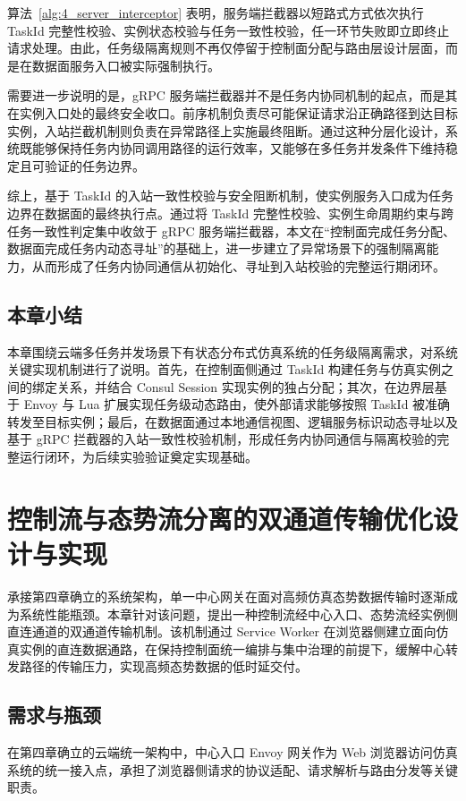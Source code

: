 \documentclass[lang=chs, degree=master, blindreview=true, winfonts=true, academic=false]{yanputhesis}
\begin{document}
算法~\ref{alg:4_server_interceptor} 表明，服务端拦截器以短路式方式依次执行 TaskId 完整性校验、实例状态校验与任务一致性校验，任一环节失败即立即终止请求处理。由此，任务级隔离规则不再仅停留于控制面分配与路由层设计层面，而是在数据面服务入口被实际强制执行。

需要进一步说明的是，gRPC 服务端拦截器并不是任务内协同机制的起点，而是其在实例入口处的最终安全收口。前序机制负责尽可能保证请求沿正确路径到达目标实例，入站拦截机制则负责在异常路径上实施最终阻断。通过这种分层化设计，系统既能够保持任务内协同调用路径的运行效率，又能够在多任务并发条件下维持稳定且可验证的任务边界。

综上，基于 TaskId 的入站一致性校验与安全阻断机制，使实例服务入口成为任务边界在数据面的最终执行点。通过将 TaskId 完整性校验、实例生命周期约束与跨任务一致性判定集中收敛于 gRPC 服务端拦截器，本文在“控制面完成任务分配、数据面完成任务内动态寻址”的基础上，进一步建立了异常场景下的强制隔离能力，从而形成了任务内协同通信从初始化、寻址到入站校验的完整运行期闭环。

\section{本章小结}

本章围绕云端多任务并发场景下有状态分布式仿真系统的任务级隔离需求，对系统关键实现机制进行了说明。首先，在控制面侧通过 TaskId 构建任务与仿真实例之间的绑定关系，并结合 Consul Session 实现实例的独占分配；其次，在边界层基于 Envoy 与 Lua 扩展实现任务级动态路由，使外部请求能够按照 TaskId 被准确转发至目标实例；最后，在数据面通过本地通信视图、逻辑服务标识动态寻址以及基于 gRPC 拦截器的入站一致性校验机制，形成任务内协同通信与隔离校验的完整运行闭环，为后续实验验证奠定实现基础。



\cleardoublepage
\chapter{控制流与态势流分离的双通道传输优化设计与实现}

承接第四章确立的系统架构，单一中心网关在面对高频仿真态势数据传输时逐渐成为系统性能瓶颈。本章针对该问题，提出一种控制流经中心入口、态势流经实例侧直连通道的双通道传输机制。该机制通过 Service Worker 在浏览器侧建立面向仿真实例的直连数据通路，在保持控制面统一编排与集中治理的前提下，缓解中心转发路径的传输压力，实现高频态势数据的低时延交付。
\section{需求与瓶颈}
在第四章确立的云端统一架构中，中心入口 Envoy 网关作为 Web 浏览器访问仿真系统的统一接入点，承担了浏览器侧请求的协议适配、请求解析与路由分发等关键职责。
\end{document}
